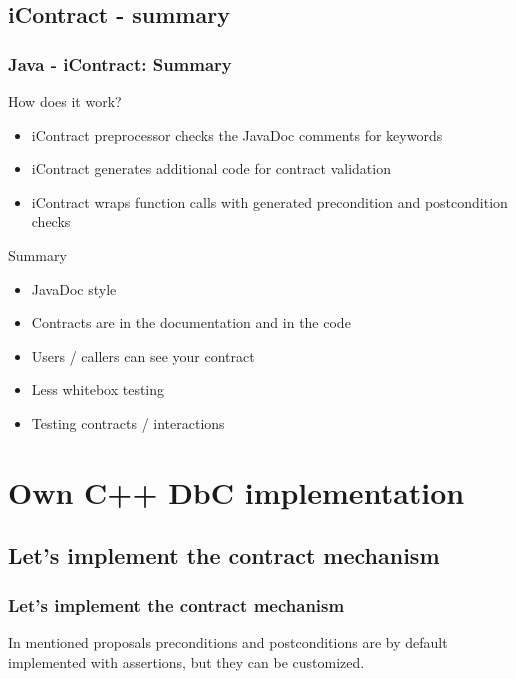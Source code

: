 \documentclass{beamer}
\begin{document}
\subsection{iContract - summary}
\begin{frame}
\frametitle{Java - iContract: Summary}
\begin{block}{How does it work?}
\begin{itemize}[<+->]
  \item iContract preprocessor checks the JavaDoc comments for keywords
  \item iContract generates additional code for contract validation
  \item iContract wraps function calls with generated precondition and postcondition checks
\end{itemize}
\end{block}
\pause
\begin{block}{Summary}
\begin{itemize}[<+->]
  \item JavaDoc style
  \item Contracts are in the documentation and in the code
  \item Users / callers can see your contract
  \item Less whitebox testing
  \item Testing contracts / interactions
\end{itemize}
\end{block}
\end{frame}




\section{Own C++ DbC implementation}
\subsection{Let's implement the contract mechanism}
\begin{frame}[fragile]
\frametitle{Let's implement the contract mechanism}

\begin{block}{}
In mentioned proposals preconditions and postconditions are by default implemented with assertions, but they can be customized.
\end{block}
\pause

\end{frame}
\end{document}
